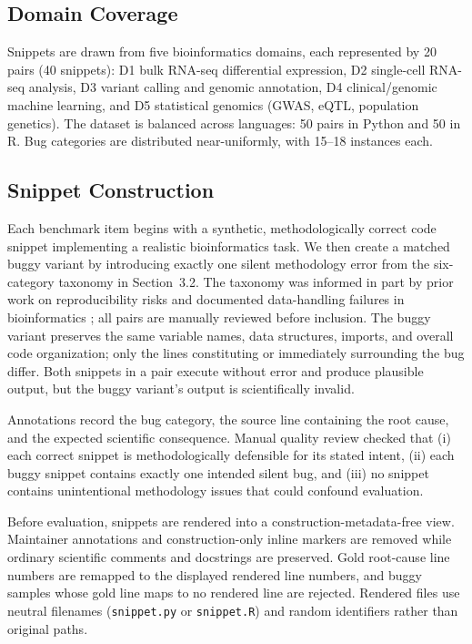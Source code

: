 \documentclass[11pt]{article}
\begin{document}
\subsection{Domain Coverage}

Snippets are drawn from five bioinformatics domains, each represented by 20 pairs (40 snippets): D1 bulk RNA-seq differential expression, D2 single-cell RNA-seq analysis, D3 variant calling and genomic annotation, D4 clinical/genomic machine learning, and D5 statistical genomics (GWAS, eQTL, population genetics). The dataset is balanced across languages: 50 pairs in Python and 50 in R. Bug categories are distributed near-uniformly, with 15--18 instances each.

\subsection{Snippet Construction}

Each benchmark item begins with a synthetic, methodologically correct code snippet implementing a realistic bioinformatics task. We then create a matched buggy variant by introducing exactly one silent methodology error from the six-category taxonomy in Section~3.2. The taxonomy was informed in part by prior work on reproducibility risks and documented data-handling failures in bioinformatics \citep{baykal2024genomic, ziemann2016gene}; all pairs are manually reviewed before inclusion. The buggy variant preserves the same variable names, data structures, imports, and overall code organization; only the lines constituting or immediately surrounding the bug differ. Both snippets in a pair execute without error and produce plausible output, but the buggy variant's output is scientifically invalid.

Annotations record the bug category, the source line containing the root cause, and the expected scientific consequence. Manual quality review checked that (i) each correct snippet is methodologically defensible for its stated intent, (ii) each buggy snippet contains exactly one intended silent bug, and (iii) no snippet contains unintentional methodology issues that could confound evaluation.


Before evaluation, snippets are rendered into a construction-metadata-free view. Maintainer annotations and construction-only inline markers are removed while ordinary scientific comments and docstrings are preserved. Gold root-cause line numbers are remapped to the displayed rendered line numbers, and buggy samples whose gold line maps to no rendered line are rejected. Rendered files use neutral filenames (\texttt{snippet.py} or \texttt{snippet.R}) and random identifiers rather than original paths.
\end{document}
